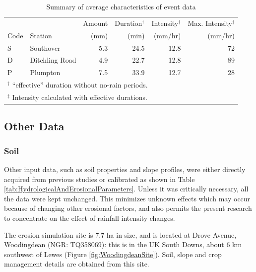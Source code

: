 \begin{table}[htbp]
\caption{Summary of average characteristics of event data}
\footnotesize
\centering
\begin{tabular}{llrrrr}
\toprule
 & & Amount & Duration$^\dagger$ & Intensity$^\ddag$ & Max. Intensity$^\ddag$
\\
Code & Station & (mm) & (min) & (mm/hr) & (mm/hr) \\ \midrule
S & Southover & 5.3 & 24.5 & 12.8 & 72 \\ \midrule
D & Ditchling Road & 4.9 & 22.7 & 12.8 & 89 \\ \midrule
P & Plumpton & 7.5 & 33.9 & 12.7 & 28 \\
\bottomrule
\multicolumn{6}{l}{$^\dag$ ``effective'' duration without no-rain periods.}\\
\multicolumn{6}{l}{$^\ddag$ Intensity calculated with effective durations.}
\end{tabular}
\label{tab:averagecharacteristicsofeventdata}
\end{table}

\subsection{Other Data}
\label{sec:OtherData}

\subsubsection{Soil}
\label{sec:Soil}

Other input data, such as soil properties and slope profiles, were either
directly acquired from previous studies \citep{favis-mortlock1998-141} or
calibrated as shown in Table \ref{tab:HydrologicalAndErosionalParameters}.
Unless it was critically necessary, all the data were kept unchanged. This
minimizes unknown effects which may occur because of changing other erosional
factors, and also permits the present research to concentrate on the effect of
rainfall intensity changes.

The erosion simulation site is 7.7 ha in size, and is located at Drove Avenue,
Woodingdean (NGR: TQ358069): this is in the UK South Downs, about 6 km southwest
of Lewes (Figure \ref{fig:WoodingdeanSite}). Soil, slope and crop management
details are obtained from this site.

